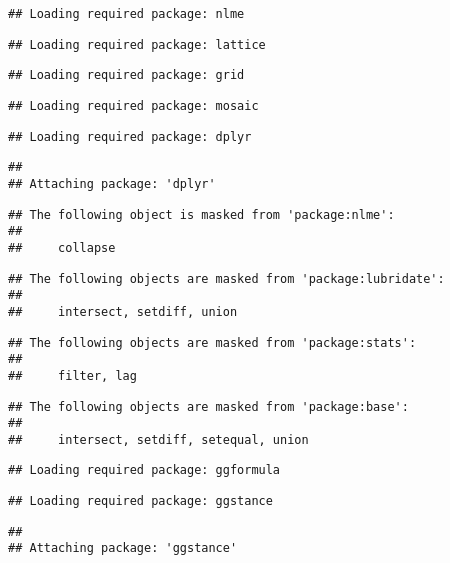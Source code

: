 \documentclass[]{article}
\begin{document}
\begin{verbatim}
## Loading required package: nlme
\end{verbatim}

\begin{verbatim}
## Loading required package: lattice
\end{verbatim}

\begin{verbatim}
## Loading required package: grid
\end{verbatim}

\begin{verbatim}
## Loading required package: mosaic
\end{verbatim}

\begin{verbatim}
## Loading required package: dplyr
\end{verbatim}

\begin{verbatim}
## 
## Attaching package: 'dplyr'
\end{verbatim}

\begin{verbatim}
## The following object is masked from 'package:nlme':
## 
##     collapse
\end{verbatim}

\begin{verbatim}
## The following objects are masked from 'package:lubridate':
## 
##     intersect, setdiff, union
\end{verbatim}

\begin{verbatim}
## The following objects are masked from 'package:stats':
## 
##     filter, lag
\end{verbatim}

\begin{verbatim}
## The following objects are masked from 'package:base':
## 
##     intersect, setdiff, setequal, union
\end{verbatim}

\begin{verbatim}
## Loading required package: ggformula
\end{verbatim}

\begin{verbatim}
## Loading required package: ggstance
\end{verbatim}

\begin{verbatim}
## 
## Attaching package: 'ggstance'
\end{verbatim}
\end{document}
